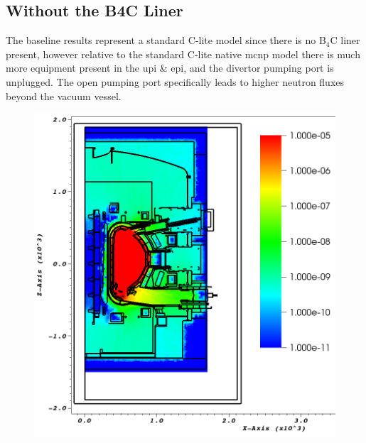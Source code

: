 \documentclass[12pt]{article}
\begin{document}
\subsection{Without the B4C Liner}
The baseline results represent a standard C-lite model since there is no B$_4$C
liner present, however relative to the standard C-lite native \gls{mcnp} model
there is much more equipment present in the \gls{upi} \& \gls{epi}, and
the divertor pumping port is unplugged. The open pumping port specifically
leads to higher neutron fluxes beyond the vacuum vessel.
\begin{figure}[ht!]
  \centering
  \includegraphics[scale=0.35]{../plots/neutron/nob4c/y_0.png}

\end{figure}
\end{document}
